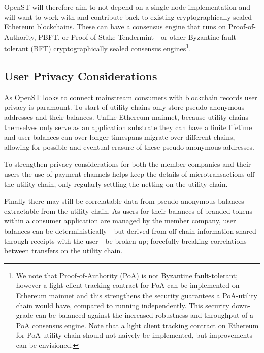 \documentclass[12pt,a4paper, twocolumn]{article}
\begin{document}
OpenST will therefore aim to not depend on a single node implementation and will want to work with and contribute back to existing cryptographically sealed Ethereum blockchains.  These can have a consensus engine that runs on Proof-of-Authority, PBFT, or Proof-of-Stake Tendermint - or other Byzantine fault-tolerant (BFT) cryptographically sealed consensus engines\footnote{We note that Proof-of-Authority (PoA) is not Byzantine fault-tolerant; however a light client tracking contract for PoA can be implemented on Ethereum mainnet and this strengthens the security guarantees a PoA-utility chain would have, compared to running independently.  This security down-grade can be balanced against the increased robustness and throughput of a PoA consensus engine.  Note that a light client tracking contract on Ethereum for PoA utility chain should not naively be implemented, but improvements can be envisioned.}.\par

\subsection{User Privacy Considerations}
As OpenST looks to connect mainstream consumers with blockchain records user privacy is paramount.  To start of utility chains only store pseudo-anonymous addresses and their balances.   Unlike Ethereum mainnet, because utility chains themselves only serve as an application substrate they can have a finite lifetime and user balances can over longer timespans migrate over different chains, allowing for possible and eventual erasure of these pseudo-anonymous addresses. \par
To strengthen privacy considerations for both the member companies and their users the use of payment channels helps keep the details of microtransactions off the utility chain, only regularly settling the netting on the utility chain. \par
Finally there may still be correlatable data from pseudo-anonymous balances extractable from the utility chain.  As users for their balances of branded tokens within a consumer application are managed by the member company, user balances can be deterministically - but derived from off-chain information shared through receipts with the user - be broken up; forcefully breaking correlations between transfers on the utility chain. \par
\end{document}
